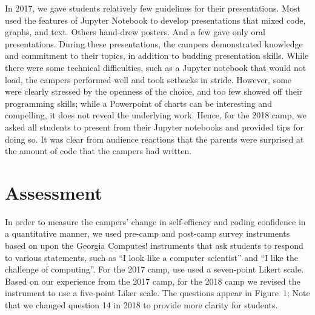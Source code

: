In 2017, we gave students relatively few guidelines for their
presentations.  Most used the features of Jupyter Notebook to develop
presentations that mixed code, graphs, and text.  Others hand-drew
posters.  And a few gave only oral presentations.  During these
presentations, the campers demonstrated knowledge and commitment
to their topics, in addition to budding presentation skills. While
there were some technical difficulties, such as a Jupyter notebook
that would not load, the campers performed well and took setbacks
in stride.  However, some were clearly stressed by the openness of
the choice, and too few showed off their programming skills; while
a Powerpoint of charts can be interesting and compelling, it does
not reveal the underlying work.  Hence, for the 2018 camp, we asked
all students to present from their Jupyter notebooks and provided
tips for doing so.  It was clear from audience reactions that the
parents were surprised at the amount of code that the campers had
written.

\section{Assessment}

In order to measure the campers' change in self-efficacy and coding
confidence in a quantitative manner, we used pre-camp and post-camp
survey
instruments based on upon the Georgia Computes! instruments
\cite{Bruckman2009} that ask students to respond to various statements,
such as ``I look like a computer scientist'' and ``I like the
challenge of computing''.  For the 2017 camp, use used  a seven-point
Likert scale.  Based on our experience from the 2017 camp, for the
2018 camp we revised the instrument to use a five-point Liker scale.
The questions appear in Figure~1; Note that we changed question
14 in 2018 to provide more clarity for students.

